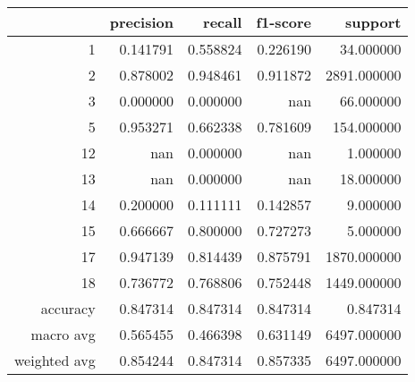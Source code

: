 \begin{tabular}{rrrrr}
\toprule
 & precision & recall & f1-score & support \\
\midrule
1 & 0.141791 & 0.558824 & 0.226190 & 34.000000 \\
2 & 0.878002 & 0.948461 & 0.911872 & 2891.000000 \\
3 & 0.000000 & 0.000000 & nan & 66.000000 \\
5 & 0.953271 & 0.662338 & 0.781609 & 154.000000 \\
12 & nan & 0.000000 & nan & 1.000000 \\
13 & nan & 0.000000 & nan & 18.000000 \\
14 & 0.200000 & 0.111111 & 0.142857 & 9.000000 \\
15 & 0.666667 & 0.800000 & 0.727273 & 5.000000 \\
17 & 0.947139 & 0.814439 & 0.875791 & 1870.000000 \\
18 & 0.736772 & 0.768806 & 0.752448 & 1449.000000 \\
accuracy & 0.847314 & 0.847314 & 0.847314 & 0.847314 \\
macro avg & 0.565455 & 0.466398 & 0.631149 & 6497.000000 \\
weighted avg & 0.854244 & 0.847314 & 0.857335 & 6497.000000 \\
\bottomrule
\end{tabular}
